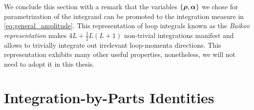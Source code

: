 We conclude this section with a remark that the variables $\{\vb*{\rho},\vb*{\alpha}\}$ we chose for parametrization of the integrand can be promoted
to the integration measure in \cref{eq:general_amplitude}. This representation of loop integrals known as the \emph{Baikov representation} \cite{Baikov:1996rk} 
makes $4 L +\frac{1}{2}L(L+1)$  non-trivial integrations manifest and allows to trivially integrate out irrelevant loop-momenta directions. This representation
exhibits many other useful properties, nonetheless, we will not need to adopt it in this thesis.




\section{Integration-by-Parts Identities}
\label{sec:ibp}


